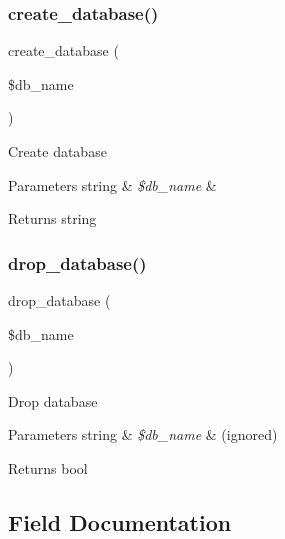 \subsubsection{\texorpdfstring{create\+\_\+database()}{create\_database()}}
{\footnotesize\ttfamily create\+\_\+database (\begin{DoxyParamCaption}\item[{}]{\$db\+\_\+name }\end{DoxyParamCaption})}

Create database


\begin{DoxyParams}[1]{Parameters}
string & {\em \$db\+\_\+name} & \\
\hline
\end{DoxyParams}
\begin{DoxyReturn}{Returns}
string 
\end{DoxyReturn}
\mbox{\label{class_c_i___d_b__pdo__firebird__forge_a9612987b2d4230de2638d15857e92e67}} 
\subsubsection{\texorpdfstring{drop\+\_\+database()}{drop\_database()}}
{\footnotesize\ttfamily drop\+\_\+database (\begin{DoxyParamCaption}\item[{}]{\$db\+\_\+name }\end{DoxyParamCaption})}

Drop database


\begin{DoxyParams}[1]{Parameters}
string & {\em \$db\+\_\+name} & (ignored) \\
\hline
\end{DoxyParams}
\begin{DoxyReturn}{Returns}
bool 
\end{DoxyReturn}


\subsection{Field Documentation}
\mbox{\label{class_c_i___d_b__pdo__firebird__forge_ae58fe6a5104d4a069a49b27533ce808f}} 

